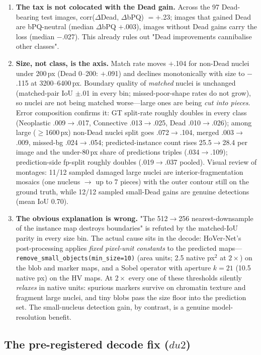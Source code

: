 \documentclass[11pt]{article}
\begin{document}
\begin{enumerate}
\item \textbf{The tax is not colocated with the Dead gain.} Across the 97 Dead-bearing test
images, corr($\Delta$Dead, $\Delta$bPQ) $=+$.23; images that gained Dead are bPQ-neutral
(median $\Delta$bPQ $+$.003), images without Dead gains carry the loss (median $-$.027). This
already rules out "Dead improvements cannibalise other classes".
\item \textbf{Size, not class, is the axis.} Match rate moves $+$.104 for non-Dead nuclei
under 200\,px (Dead 0--200: $+$.091) and declines monotonically with size to $-$.115 at
3200--6400\,px. Boundary quality of \emph{matched} nuclei is unchanged (matched-pair IoU
$\pm$.01 in every bin; missed-poor-shape rates do not grow), so nuclei are not being
matched worse---large ones are being \emph{cut into pieces}. Error composition confirms it:
GT split-rate roughly doubles in every class (Neoplastic .009$\to$.017, Connective
.013$\to$.025, Dead .010$\to$.026); among large ($\geq$1600\,px) non-Dead nuclei split goes
.072$\to$.104, merged .003$\to$.009, missed-bg .024$\to$.054; predicted-instance count rises
25.5$\to$28.4 per
image and the under-80\,px share of predictions triples (.034$\to$.109); prediction-side
fp-split roughly doubles (.019$\to$.037 pooled). Visual review of montages: 11/12 sampled
damaged large nuclei are interior-fragmentation mosaics (one nucleus $\to$ up to 7 pieces)
with the outer contour still on the ground truth, while 12/12 sampled small-Dead gains are
genuine detections (mean IoU 0.70).
\item \textbf{The obvious explanation is wrong.} "The 512$\to$256 nearest-downsample of the
instance map destroys boundaries" is refuted by the matched-IoU parity in every size bin.
The actual cause sits in the decode: HoVer-Net's post-processing applies \emph{fixed
pixel-unit constants} to the predicted maps---\texttt{remove\_small\_objects(min\_size=10)}
(area units; 2.5 native px$^2$ at $2\times$) on the blob and marker maps, and a Sobel
operator with aperture $k=21$ (10.5 native px) on the HV maps. At $2\times$ every one of
these thresholds silently \emph{relaxes} in native units: spurious markers survive on
chromatin texture and fragment large nuclei, and tiny blobs pass the size floor into the
prediction set. The small-nucleus detection gain, by contrast, is a genuine model-resolution
benefit.
\end{enumerate}

\subsection{The pre-registered decode fix ($du2$)}
\label{sec:du2}
\end{document}

